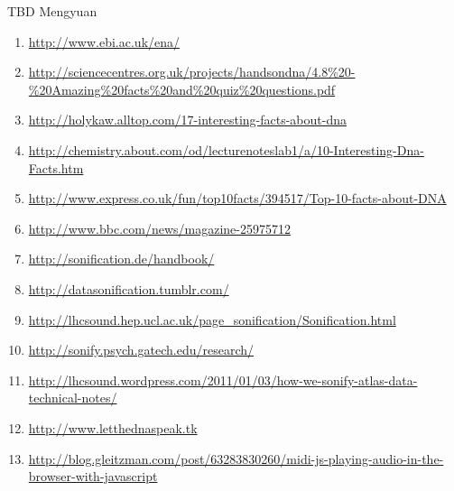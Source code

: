 \documentclass[12pt]{article}
\begin{document}
TBD Mengyuan

\nocite{embl_ebi_ena}
\nocite{inter_facts_dna}
\nocite{inter_facts_dna2}
\nocite{bbc_sonification}
\nocite{sonification_handbook}

\printbibliography


\begin{enumerate}
	\item \url{http://www.ebi.ac.uk/ena/}
	\item \url{http://sciencecentres.org.uk/projects/handsondna/4.8%20-%20Amazing%20facts%20and%20quiz%20questions.pdf}
	\item \url{http://holykaw.alltop.com/17-interesting-facts-about-dna}
	\item \url{http://chemistry.about.com/od/lecturenoteslab1/a/10-Interesting-Dna-Facts.htm}
	\item \url{http://www.express.co.uk/fun/top10facts/394517/Top-10-facts-about-DNA}
	\item \url{http://www.bbc.com/news/magazine-25975712}
	\item \url{http://sonification.de/handbook/}
	\item \url{http://datasonification.tumblr.com/}
	\item \url{http://lhcsound.hep.ucl.ac.uk/page_sonification/Sonification.html}
	\item \url{http://sonify.psych.gatech.edu/research/}
	\item \url{http://lhcsound.wordpress.com/2011/01/03/how-we-sonify-atlas-data-technical-notes/}
	\item \url{http://www.letthednaspeak.tk}
	\item \url{http://blog.gleitzman.com/post/63283830260/midi-js-playing-audio-in-the-browser-with-javascript}

\end{enumerate}
\end{document}
